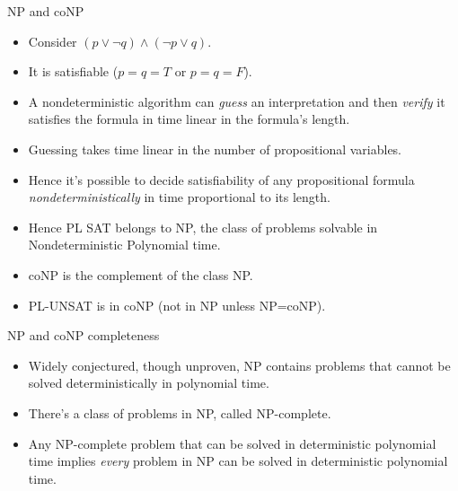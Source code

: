 \documentclass[style=sailor,size=12pt]{powerdot}
\begin{document}
\begin{wideslide}[bm=,toc=]{NP and coNP}
\begin{itemize}
\item Consider $(p\vee\neg q)\wedge(\neg p\vee q)$.
\item It is satisfiable ($p=q=T$ or $p=q=F$).
\item A nondeterministic algorithm can {\em guess\/} an interpretation and then {\em verify\/}
it satisfies the formula in time linear in the formula's length.
\item Guessing takes time linear in the number of propositional variables.
\item Hence it's possible to decide satisfiability of any propositional formula {\em nondeterministically\/}
in time proportional to its length.
\item Hence PL SAT belongs to NP, the class of problems 
solvable in Nondeterministic Polynomial time.
\item coNP is the complement of the class NP.
\item PL-UNSAT is in coNP (not in NP unless NP=coNP).
\end{itemize}
\end{wideslide}


\begin{wideslide}[bm=,toc=]{NP and coNP completeness}
\begin{itemize}
\item Widely conjectured, though unproven, NP contains problems that cannot be solved deterministically
in polynomial time.
\item There's a class of problems in NP, called NP-complete.
\item Any NP-complete problem that can be solved in deterministic polynomial time implies {\em every\/}
problem in NP can be solved in deterministic polynomial time.
\end{itemize}
\end{wideslide}
\end{document}
